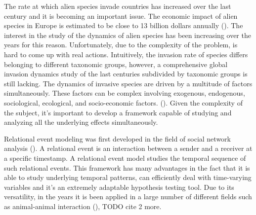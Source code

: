\documentclass[mscthesis]{usiinfthesis}
\begin{document}
The rate at which alien species invade countries has increased over the last century and it is becoming an important issue. The economic impact of alien species in Europe is estimated to be close to 13 billion dollars annually (\cite{intro:rate}). The interest in the study of the dynamics of alien species has been increasing over the years for this reason. Unfortunately, due to the complexity of the problem, is hard to come up with real actions. Intuitively, the invasion rate of species differs belonging to different taxonomic groups, however, a comprehensive global invasion dynamics study of the last centuries subdivided by taxonomic groups is still lacking. The dynamics of invasive species are driven by a multitude of factors simultaneously. These factors can be complex involving exogenous, endogenous, sociological, ecological, and socio-economic factors. (\cite{intro:factors}). Given the complexity of the subject, it's important to develop a framework capable of studying and analyzing all the underlying effects simultaneously. 

Relational event modeling was first developed in the field of social network analysis (\cite{rem:butts}). A relational event is an interaction between a sender and a receiver at a specific timestamp. A relational event model studies the temporal sequence of such relational events. This framework has many advantages in the fact that it is able to study underlying temporal patterns, can efficiently deal with time-varying variables and it's an extremely adaptable hypothesis testing tool. Due to its versatility, in the years it is been applied in a large number of different fields such as animal-animal interaction (\citet{intro:cattle}), TODO cite 2 more.

%
\end{document}
